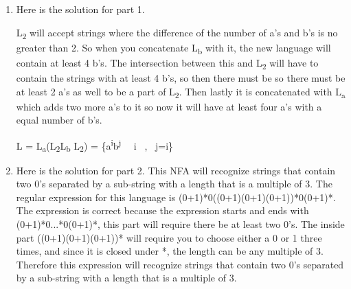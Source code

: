 \documentclass[11pt]{article}
\begin{document}
\begin{enumerate}
\item Here is the solution for part 1.

L\textsubscript{2} will accept strings where the difference of the number of a's and b's is no greater than 2. So when you concatenate L\textsubscript{b} with it, the new language will contain at least 4 b's. The intersection between this and L\textsubscript{2} will have to contain the strings with at least 4 b's, so then there must be so there must be at least 2 a's as well to be a part of L\textsubscript{2}. Then lastly it is concatenated with L\textsubscript{a} which adds two more a's to it so now it will have at least four a's with a equal number of b's.
{

L = L\textsubscript{a}(L\textsubscript{2}L\textsubscript{b} \cap L\textsubscript{2}) = \{a\textsuperscript{i}b\textsuperscript{j} \  \vert \ i  \ , \ j=i\}
\newline
}

\item Here is the solution for part 2.
\newline
This NFA will recognize strings that contain two 0's separated by a sub-string with a length that is a multiple of 3. The regular expression for this language is (0+1)*0((0+1)(0+1)(0+1))*0(0+1)*. 
\newline
\newline
The expression is correct because the expression starts and ends with (0+1)*0...*0(0+1)*, this part will require there be at least two 0's. The inside part ((0+1)(0+1)(0+1))* will require you to choose either a 0 or 1 three times, and since it is closed under *, the length can be any multiple of 3. Therefore this expression will recognize strings that contain two 0's separated by a sub-string with a length that is a multiple of 3.
\end{enumerate}
\newpage
\end{document}
